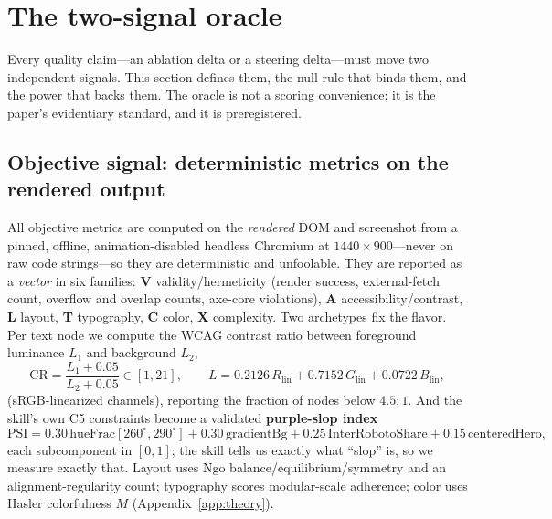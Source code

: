 \section{The two-signal oracle}
\label{sec:oracle}

Every quality claim---an ablation delta or a steering delta---must move two independent signals.
This section defines them, the null rule that binds them, and the power that backs them. The
oracle is not a scoring convenience; it is the paper's evidentiary standard, and it is
preregistered.

\subsection{Objective signal: deterministic metrics on the rendered output}
All objective metrics are computed on the \emph{rendered} DOM and screenshot from a pinned,
offline, animation-disabled headless Chromium at $1440\times900$---never on raw code
strings---so they are deterministic and unfoolable. They are reported as a \emph{vector} in six
families: \textbf{V} validity/hermeticity (render success, external-fetch count, overflow and
overlap counts, axe-core violations), \textbf{A} accessibility/contrast, \textbf{L} layout,
\textbf{T} typography, \textbf{C} color, \textbf{X} complexity. Two archetypes fix the flavor.
Per text node we compute the WCAG contrast ratio between foreground luminance $L_1$ and
background $L_2$,
\begin{equation}
\mathrm{CR}=\frac{L_1+0.05}{L_2+0.05}\in[1,21],\qquad
L=0.2126\,R_{\mathrm{lin}}+0.7152\,G_{\mathrm{lin}}+0.0722\,B_{\mathrm{lin}},
\label{eq:wcag}
\end{equation}
(sRGB-linearized channels), reporting the fraction of nodes below $4.5{:}1$. And the skill's own
C5 constraints become a validated \textbf{purple-slop index}
\begin{equation}
\mathrm{PSI}=0.30\,\mathrm{hueFrac}[260^\circ,290^\circ]+0.30\,\mathrm{gradientBg}
+0.25\,\mathrm{InterRobotoShare}+0.15\,\mathrm{centeredHero},
\label{eq:psi}
\end{equation}
each subcomponent in $[0,1]$; the skill tells us exactly what ``slop'' is, so we measure exactly
that. Layout uses Ngo balance/equilibrium/symmetry and an alignment-regularity count; typography
scores modular-scale adherence; color uses Hasler colorfulness $M$ (Appendix~\ref{app:theory}).

